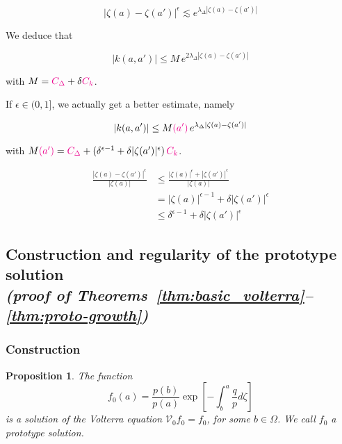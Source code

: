 \documentclass{article}
\theoremstyle{plain}
\newtheorem{prop}{Proposition}
\newcommand{\hardpart}{\mathcal{V}_0}
\newenvironment{verify}{\color{ForestGreen}}{\color{black}}
\begin{document}
\[|\zeta(a)-\zeta(a')|^\epsilon\lesssim e^{\lambda_\Delta |\zeta(a)-\zeta(a')|} \]

We deduce that 

\[ |k(a,a')| \leq M\, e^{2 \lambda_\Delta |\zeta(a)-\zeta(a')|} \]

with $M= \textcolor{magenta}{C_\Delta} + \delta \textcolor{magenta}{C_k}$. 

\color{purple}If $\epsilon\in (0,1]$, we actually get a better estimate, namely 

\[ |k(a,a')| \leq M\textcolor{magenta}{(a')}\, e^{ \lambda_\Delta |\zeta(a)-\zeta(a')|} \]

with $M\textcolor{magenta}{(a')} = \textcolor{magenta}{C_\Delta} + (\delta^{\epsilon-1}+\delta |\zeta(a')|^\epsilon ) \,  \textcolor{magenta}{C_k}$.\color{black}

\begin{verify}
    \begin{align*}
        \frac{|\zeta(a)-\zeta(a')|^\epsilon}{|\zeta(a)|} & \leq \frac{|\zeta(a)|^\epsilon + |\zeta(a')|^\epsilon}{|\zeta(a)|}\\
        &= |\zeta(a)|^{\epsilon-1}+ \delta |\zeta(a')|^\epsilon\\
        &\leq \delta^{\epsilon-1}+ \delta |\zeta(a')|^\epsilon 
    \end{align*}
\end{verify}




\subsection{Construction and regularity of the prototype solution \\ \textit{(proof of Theorems~\ref{thm:basic_volterra}--\ref{thm:proto-growth})}}\label{sec:proto-construction-regularity}

\subsubsection{Construction}\label{sec:construction}

\begin{prop}\label{prop:construction}
    The function 
    \begin{equation}%
    f_0(a)=\frac{p(b)}{p(a)} \exp\left[-\int_{b}^{a}\frac{q}{p} d\zeta\right]
   \end{equation}
is a solution of the Volterra equation $\hardpart f_0=f_0$, for some $b\in\Omega$. We call $f_0$ a prototype solution.  
\end{prop}
\end{document}
